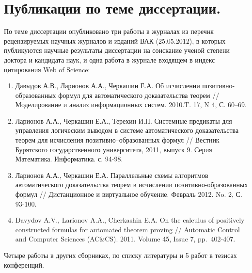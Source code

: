 \section*{Публикации по теме диссертации.} По теме диссертации опубликовано три работы в журналах из перечня рецензируемых научных журналов и изданий ВАК (25.05.2012), в которых публикуются научные результаты диссертации на соискание ученой степени доктора и кандидата наук, и одна работа в журнале входящем в индекс цитирования Web of Science:
\begin{enumerate}
\item Давыдов А.В., Ларионов А.А., Черкашин Е.А. Об исчислении позитивно-образованных формул для автоматического доказательства теорем // Моделирование и анализ информационных систем. 2010.T. 17, N 4, С. 60--69.
\item Ларионов А.А., Черкашин Е.А., Терехин И.Н. Системные предикаты для управления логическим выводом в системе автоматического доказательства теорем для исчисления позитивно--образованных формул // Вестник Бурятского государственного университета, 2011, выпуск 9. Серия Математика. Информатика. с. 94-98.
\item Ларионов А.А., Черкашин Е.А. Параллельные схемы алгоритмов автоматического доказательства теорем в исчислении
позитивно-образованных формул // Дистанционное и виртуальное обучение. Февраль 2012. No. 2, С. 93-100.
\item Davydov A.V., Larionov A.A., Cherkashin E.A. On the calculus of positively constructed formulas for automated theorem proving // Automatic Control and Computer Sciences (AC\&CS). 2011. Volume 45, Issue 7, pp.~402-407.
\end{enumerate}

Четыре работы в других сборниках, по списку литературы \cite{viner, QUANT4, mipro, semver} и 5 работ в тезисах конференций.



